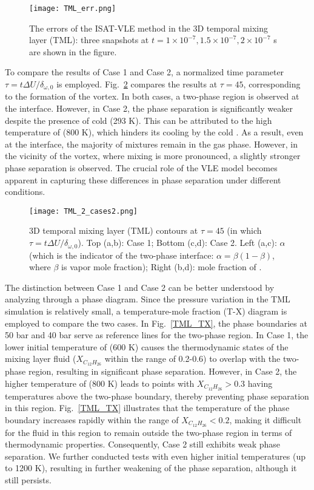 \begin{figure}[htbp]
\centering
\texttt{[image: TML\_err.png]}
\caption{The errors of the ISAT-VLE method in the 3D temporal mixing layer (TML): three snapshots at $t = 1\times 10^{-7}, 1.5 \times 10^{-7}, 2\times 10^{-7}$ s are shown in the figure.}
\label{TML_3D_err} 
\end{figure}


To compare the results of Case 1 and Case 2, a normalized time parameter $\tau = t \Delta U/ \delta_{\omega,0}$  is employed. Fig.~\ref{TML_3D_result} compares the results at $\tau = 45$, corresponding to the formation of the vortex. In both cases, a two-phase region is observed at the interface. However, in Case 2, the phase separation is significantly weaker despite the presence of cold  (293 K). This can be attributed to the high temperature of  (800 K), which hinders its cooling by the cold .  As a result, even at the interface, the majority of mixtures remain in the gas phase. However, in the vicinity of the vortex, where mixing is more pronounced, a slightly stronger phase separation is observed. The crucial role of the VLE model becomes apparent in capturing these differences in phase separation under different conditions.


\begin{figure}[htbp]
\centering
\texttt{[image: TML\_2\_cases2.png]}

\caption{3D temporal mixing layer (TML) contours at $\tau = 45$ (in which $\tau = t \Delta U/ \delta_{\omega,0}$). Top (a,b): Case 1; Bottom (c,d): Case 2. Left (a,c): $\alpha$ (which is the indicator of the two-phase interface: $\alpha = \beta(1-\beta)$, where $\beta$ is vapor mole fraction); Right (b,d): mole fraction of .}
\label{TML_3D_result} 
\end{figure}
The distinction between Case 1 and Case 2 can be better understood by analyzing through a phase diagram. Since the pressure variation in the TML simulation is relatively small, a temperature-mole fraction (T-X) diagram is employed to compare the two cases. In Fig.~\ref{TML_TX}, the phase boundaries at 50 bar and 40 bar serve as reference lines for the two-phase region. In Case 1, the lower initial temperature of  (600 K) causes the thermodynamic states of the mixing layer fluid ($X_{C_{12}H_{26}}$ within the range of 0.2-0.6) to overlap with the two-phase region, resulting in significant phase separation. However, in Case 2, the higher temperature of  (800 K) leads to points with $X_{C_{12}H_{26}}>0.3$ having temperatures above the two-phase boundary, thereby preventing phase separation in this region. Fig.~\ref{TML_TX} illustrates that the temperature of the phase boundary increases rapidly within the range of $X_{C_{12}H_{26}}<0.2$, making it difficult for the fluid in this region to remain outside the two-phase region in terms of thermodynamic properties. Consequently, Case 2 still exhibits weak phase separation. We further conducted tests with even higher initial  temperatures (up to 1200 K), resulting in further weakening of the phase separation, although it still persists.

